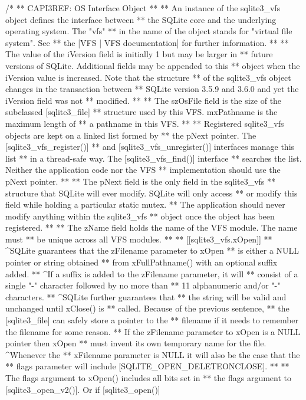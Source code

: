 \begin{Codex}[label=sqlite3.h,numbers=left]
{/*
** CAPI3REF: OS Interface Object
**
** An instance of the sqlite3_vfs object defines the interface between
** the SQLite core and the underlying operating system.  The "vfs"
** in the name of the object stands for "virtual file system".  See
** the [VFS | VFS documentation] for further information.
**
** The value of the iVersion field is initially 1 but may be larger in
** future versions of SQLite.  Additional fields may be appended to this
** object when the iVersion value is increased.  Note that the structure
** of the sqlite3_vfs object changes in the transaction between
** SQLite version 3.5.9 and 3.6.0 and yet the iVersion field was not
** modified.
**
** The szOsFile field is the size of the subclassed [sqlite3_file]
** structure used by this VFS.  mxPathname is the maximum length of
** a pathname in this VFS.
**
** Registered sqlite3_vfs objects are kept on a linked list formed by
** the pNext pointer.  The [sqlite3_vfs_register()]
** and [sqlite3_vfs_unregister()] interfaces manage this list
** in a thread-safe way.  The [sqlite3_vfs_find()] interface
** searches the list.  Neither the application code nor the VFS
** implementation should use the pNext pointer.
**
** The pNext field is the only field in the sqlite3_vfs
** structure that SQLite will ever modify.  SQLite will only access
** or modify this field while holding a particular static mutex.
** The application should never modify anything within the sqlite3_vfs
** object once the object has been registered.
**
** The zName field holds the name of the VFS module.  The name must
** be unique across all VFS modules.
**
** [[sqlite3_vfs.xOpen]]
** ^SQLite guarantees that the zFilename parameter to xOpen
** is either a NULL pointer or string obtained
** from xFullPathname() with an optional suffix added.
** ^If a suffix is added to the zFilename parameter, it will
** consist of a single "-" character followed by no more than
** 11 alphanumeric and/or "-" characters.
** ^SQLite further guarantees that
** the string will be valid and unchanged until xClose() is
** called. Because of the previous sentence,
** the [sqlite3_file] can safely store a pointer to the
** filename if it needs to remember the filename for some reason.
** If the zFilename parameter to xOpen is a NULL pointer then xOpen
** must invent its own temporary name for the file.  ^Whenever the 
** xFilename parameter is NULL it will also be the case that the
** flags parameter will include [SQLITE_OPEN_DELETEONCLOSE].
**
** The flags argument to xOpen() includes all bits set in
** the flags argument to [sqlite3_open_v2()].  Or if [sqlite3_open()]
}
\end{Codex}
